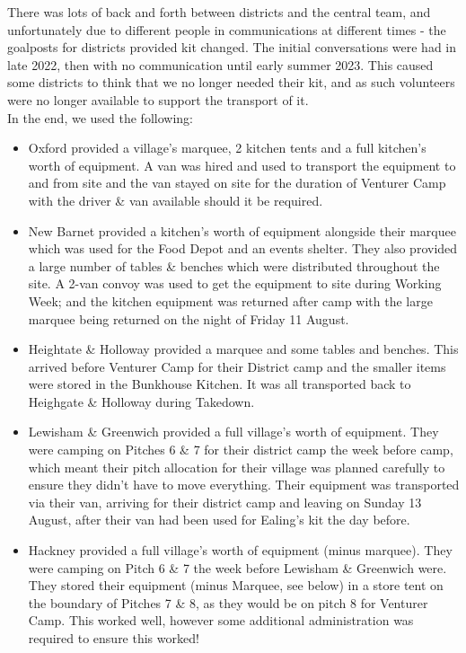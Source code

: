 There was lots of back and forth between districts and the central team, and unfortunately due to different people in communications at different times - the goalposts for districts provided kit changed. The initial conversations were had in late 2022, then with no communication until early summer 2023. This caused some districts to think that we no longer needed their kit, and as such volunteers were no longer available to support the transport of it. \\

In the end, we used the following:
\begin{itemize}
    \item Oxford provided a village's marquee, 2 kitchen tents and a full kitchen's worth of equipment. A van was hired and used to transport the equipment to and from site and the van stayed on site for the duration of Venturer Camp with the driver \& van available should it be required.
    \item New Barnet provided a kitchen's worth of equipment alongside their marquee which was used for the Food Depot and an events shelter. They also provided a large number of tables \& benches which were distributed throughout the site. A 2-van convoy was used to get the equipment to site during Working Week; and the kitchen equipment was returned after camp with the large marquee being returned on the night of Friday 11 August.
    \item Heightate \& Holloway provided a marquee and some tables and benches. This arrived before Venturer Camp for their District camp and the smaller items were stored in the Bunkhouse Kitchen. It was all transported back to Heighgate \& Holloway during Takedown. 
    \item Lewisham \& Greenwich provided a full village's worth of equipment. They were camping on Pitches 6 \& 7 for their district camp the week before camp, which meant their pitch allocation for their village was planned carefully to ensure they didn't have to move everything. Their equipment was transported via their van, arriving for their district camp and leaving on Sunday 13 August, after their van had been used for Ealing's kit the day before. 
    \item Hackney provided a full village's worth of equipment (minus marquee). They were camping on Pitch 6 \& 7 the week before Lewisham \& Greenwich were. They stored their equipment (minus Marquee, see below) in a store tent on the boundary of Pitches 7 \& 8, as they would be on pitch 8 for Venturer Camp. This worked well, however some additional administration was required to ensure this worked! 

\end{itemize}
